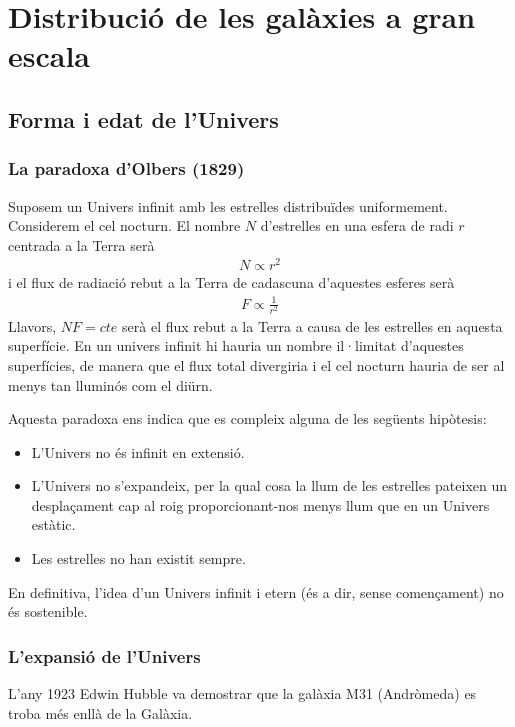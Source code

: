 \section{Distribució de les galàxies a gran escala}
\subsection{Forma i edat de l'Univers}
\subsubsection*{La paradoxa d'Olbers (1829)}
Suposem un Univers infinit amb les estrelles distribuïdes uniformement. Considerem el cel nocturn. El nombre $N$ d'estrelles en una esfera de radi $r$ centrada a la Terra serà
\begin{align}
	N \propto r^{2}
\end{align}
i el flux de radiació rebut a la Terra de cadascuna d'aquestes esferes serà
\begin{align}
	F \propto \frac{1}{r^{2}}
\end{align}
Llavors, $NF = cte$ serà el flux rebut a la Terra a causa de les estrelles en aquesta superfície. En un univers infinit hi hauria un nombre il·limitat d'aquestes superfícies, de manera que el flux total divergiria i el cel nocturn hauria de ser al menys tan lluminós com el diürn.

Aquesta paradoxa ens indica que es compleix alguna de les següents hipòtesis:
\begin{itemize}
	\item L'Univers no és infinit en extensió.
	\item L'Univers no s'expandeix, per la qual cosa la llum de les estrelles pateixen un desplaçament cap al roig proporcionant-nos menys llum que en un Univers estàtic.
	\item Les estrelles no han existit sempre.
\end{itemize}
En definitiva, l'idea d'un Univers infinit i etern (és a dir, sense començament) no és sostenible.

\subsubsection*{L'expansió de l'Univers}
L'any 1923 Edwin Hubble va demostrar que la galàxia M31 (Andròmeda) es troba més enllà de la Galàxia.

